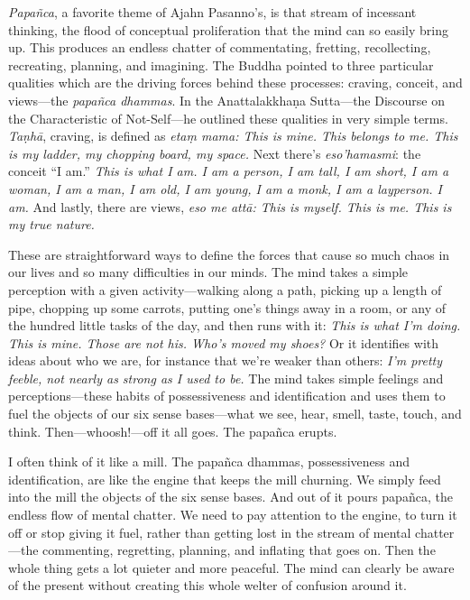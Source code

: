 \emph{Papañca}, a favorite theme of Ajahn Pasanno's, is that stream of 
incessant thinking, the flood of conceptual proliferation that the mind 
can so easily bring up. This produces an endless chatter of 
commentating, fretting, recollecting, recreating, planning, and 
imagining. The Buddha pointed to three particular qualities which are 
the driving forces behind these processes: craving, conceit, and 
views---the \emph{papañca dhammas}. In the Anattalakkhaṇa 
Sutta---the Discourse on the Characteristic of Not-Self---he outlined 
these qualities in very simple terms. \emph{Taṇhā}, craving, is 
defined as \emph{etaṃ mama: This is mine. This belongs to me. This is 
my ladder, my chopping board, my space.} Next there's 
\emph{eso'hamasmi}: the conceit ``I am.'' \emph{This is what I am. I am 
a person, I am tall, I am short, I am a woman, I am a man, I am old, I 
am young, I am a monk, I am a layperson. I am.} And lastly, there are 
views, \emph{eso me attā: This is myself. This is me. This is my true 
nature.}

These are straightforward ways to define the forces that cause so much 
chaos in our lives and so many difficulties in our minds. The mind 
takes a simple perception with a given activity---walking along a path, 
picking up a length of pipe, chopping up some carrots, putting one's 
things away in a room, or any of the hundred little tasks of the day, 
and then runs with it: \emph{This is what I'm doing. This is mine. 
Those are not his. Who's moved my shoes?} Or it identifies with ideas 
about who we are, for instance that we're weaker than others: \emph{I'm 
pretty feeble, not nearly as strong as I used to be.} The mind takes 
simple feelings and perceptions---these habits of possessiveness and 
identification and uses them to fuel the objects of our six sense 
bases---what we see, hear, smell, taste, touch, and think. 
Then---whoosh!---off it all goes. The papañca erupts.

I often think of it like a mill. The papañca dhammas, possessiveness 
and identification, are like the engine that keeps the mill churning. 
We simply feed into the mill the objects of the six sense bases. And 
out of it pours papañca, the endless flow of mental chatter. We need 
to pay attention to the engine, to turn it off or stop giving it fuel, 
rather than getting lost in the stream of mental chatter---the 
commenting, regretting, planning, and inflating that goes on. Then the 
whole thing gets a lot quieter and more peaceful. The mind can clearly 
be aware of the present without creating this whole welter of confusion 
around it.

